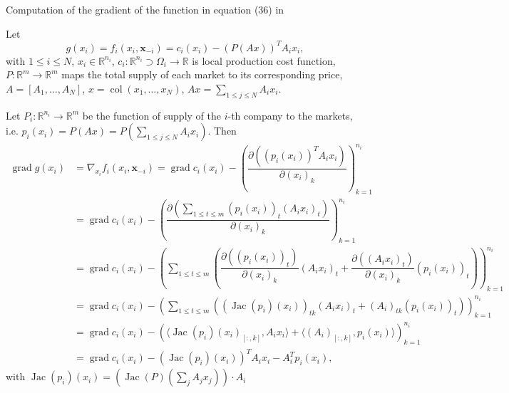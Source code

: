 
Computation of the gradient of the function in equation (36) in \citep{Yi_2019}

Let
$$g(x_i) = f_i(x_i, \mathbf{x}_{-i}) = c_i(x_i) - (P(Ax))^T A_ix_i,$$
with $1 \leqslant i \leqslant N$, $x_i \in \mathbb{R}^{n_i}$, $c_i: \mathbb{R}^{n_i} \supset \Omega_i \to \mathbb{R}$ is local production cost function, $P: \mathbb{R}^m \to \mathbb{R}^m$ maps the total supply of each market to its corresponding price, $A = [A_1, \ldots, A_N]$, $x = \operatorname{col}(x_1, \ldots, x_N)$, $Ax = \sum\limits_{1 \leqslant j \leqslant N} A_ix_i$. 

Let $P_i: \mathbb{R}^{n_i} \to \mathbb{R}^m$ be the function of supply of the $i$-th company to the markets, i.e. $p_i(x_i) = P(Ax) = P\left(\sum\limits_{1 \leqslant j \leqslant N} A_ix_i\right)$. Then
\begin{align*}
\operatorname{grad} g(x_i) & = \nabla_{x_i} f_i(x_i, \mathbf{x}_{-i}) = \operatorname{grad} c_i(x_i) - \left( \dfrac{\partial \left( (p_i(x_i))^T A_ix_i \right)}{\partial (x_i)_k} \right)_{k=1}^{n_i} \\
& = \operatorname{grad} c_i(x_i) - \left( \dfrac{\partial \left( \sum\limits_{1\leqslant t \leqslant m} (p_i(x_i))_t (A_ix_i)_t \right)}{\partial (x_i)_k} \right)_{k=1}^{n_i} \\
& = \operatorname{grad} c_i(x_i) - \left( \sum\limits_{1\leqslant t \leqslant m}\left( \dfrac{\partial \left( (p_i(x_i))_t \right)}{\partial (x_i)_k} (A_ix_i)_t + \dfrac{\partial \left( (A_ix_i)_t \right)}{\partial (x_i)_k} (p_i(x_i))_t \right) \right)_{k=1}^{n_i} \\
& = \operatorname{grad} c_i(x_i) - \left( \sum\limits_{1\leqslant t \leqslant m}\left( \left(\operatorname{Jac} (p_i)(x_i) \right)_{tk} (A_ix_i)_t + (A_i)_{tk} (p_i(x_i))_t \right) \right)_{k=1}^{n_i} \\
& = \operatorname{grad} c_i(x_i) - \left( \langle \operatorname{Jac}(p_i)(x_i)_{[:,k]}, A_ix_i \rangle + \langle (A_i)_{[:,k]}, p_i(x_i) \rangle \right)_{k=1}^{n_i} \\
& =\operatorname{grad} c_i(x_i) - \left( \operatorname{Jac}(p_i)(x_i) \right)^T A_ix_i - A_i^T p_i(x_i),
\end{align*}
with $\operatorname{Jac}(p_i)(x_i) = \left( \operatorname{Jac}(P)(\sum\limits_j A_jx_j) \right) \cdot A_i$


